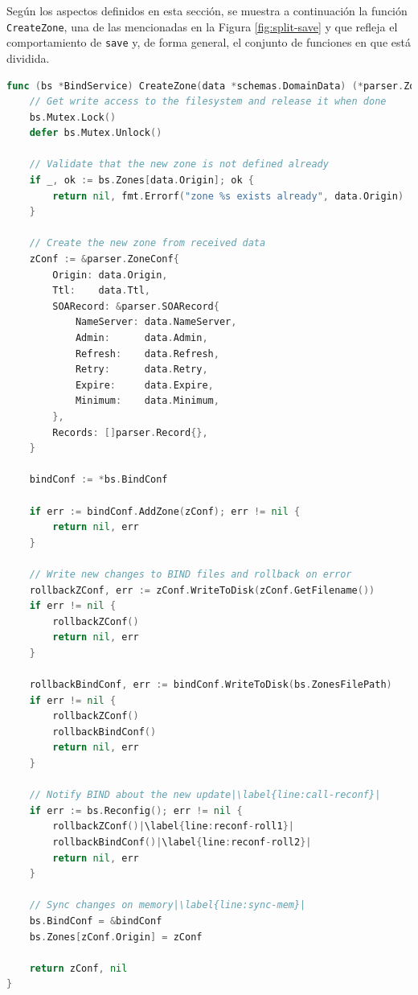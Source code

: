 Según los aspectos definidos en esta sección, se muestra a continuación la función \verb|CreateZone|, una de las mencionadas en la Figura \ref{fig:split-save} y que refleja el comportamiento de \verb|save| y, de forma general, el conjunto de funciones en que está dividida.

\label{func:create-zone}
\begin{lstlisting}[frame=single, language=Go, escapechar=|, caption=Ejemplo de la función que añade una nueva zona al servidor DNS.]
func (bs *BindService) CreateZone(data *schemas.DomainData) (*parser.ZoneConf, error) {
    // Get write access to the filesystem and release it when done
    bs.Mutex.Lock()
    defer bs.Mutex.Unlock()

    // Validate that the new zone is not defined already 
    if _, ok := bs.Zones[data.Origin]; ok {
        return nil, fmt.Errorf("zone %s exists already", data.Origin)
    }

    // Create the new zone from received data
    zConf := &parser.ZoneConf{
        Origin: data.Origin,
        Ttl:    data.Ttl,
        SOARecord: &parser.SOARecord{
            NameServer: data.NameServer,
            Admin:      data.Admin,
            Refresh:    data.Refresh,
            Retry:      data.Retry,
            Expire:     data.Expire,
            Minimum:    data.Minimum,
        },
        Records: []parser.Record{},
    }

	bindConf := *bs.BindConf

	if err := bindConf.AddZone(zConf); err != nil {
		return nil, err
	}

    // Write new changes to BIND files and rollback on error
	rollbackZConf, err := zConf.WriteToDisk(zConf.GetFilename())
	if err != nil {
		rollbackZConf()
		return nil, err
	}

	rollbackBindConf, err := bindConf.WriteToDisk(bs.ZonesFilePath)
	if err != nil {
		rollbackZConf()
		rollbackBindConf()
		return nil, err
	}

    // Notify BIND about the new update|\label{line:call-reconf}|
	if err := bs.Reconfig(); err != nil {
		rollbackZConf()|\label{line:reconf-roll1}|
		rollbackBindConf()|\label{line:reconf-roll2}|
		return nil, err
	}

    // Sync changes on memory|\label{line:sync-mem}|
	bs.BindConf = &bindConf
	bs.Zones[zConf.Origin] = zConf

	return zConf, nil
}
\end{lstlisting}

